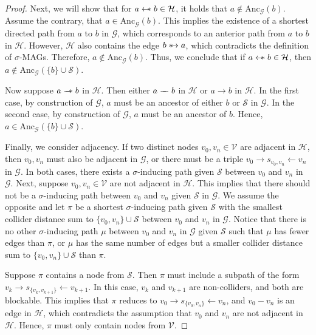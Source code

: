 \documentclass[accepted]{uai2025} %
\newcommand{\anc}{\text{Anc}}
\newcommand{\tuh}{\mathrel{\rightarrow}}
\newcommand{\hus}{\mathrel{{\leftarrow\mkern-11mu\ast}}}
\newcommand{\suh}{\mathrel{{\ast\mkern-11mu\to}}}
\newcommand{\tus}{\mathrel{{\relbar\mkern-11mu\relbar\mkern-11mu\ast}}}
\newcommand{\tut}{\mathrel{{\relbar\mkern-9mu\relbar}}}
\begin{document}
\begin{proof}
Next, we will show that for \( a \hus b \in \mathcal{H} \), it holds that \( a \notin \anc_{\mathcal{G}}(b) \). Assume the contrary, that \( a \in \anc_\mathcal{G}(b) \). This implies the existence of a shortest directed path from \( a \) to \( b \) in \( \mathcal{G} \), which corresponds to an anterior path from \( a \) to \( b \) in \( \mathcal{H} \). However, \( \mathcal{H} \) also contains the edge \( b \suh a \), which contradicts the definition of \( \sigma \)-MAGs. Therefore, \( a \notin \anc_\mathcal{G}(b) \). Thus, we conclude that if \( a \hus b \in \mathcal{H} \), then \( a \notin \anc_\mathcal{G}(\{b\} \cup \mathcal{S}) \).

Now suppose \( a \tus b \) in \( \mathcal{H} \). Then either \( a \tut b \) in \( \mathcal{H} \) or \( a \tuh b \) in \( \mathcal{H} \). In the first case, by construction of \( \mathcal{G} \), \( a \) must be an ancestor of either \( b \) or \( \mathcal{S} \) in \( \mathcal{G} \). In the second case, by construction of \( \mathcal{G} \), \( a \) must be an ancestor of \( b \). Hence, \( a \in \anc_{\mathcal{G}}(\{b\} \cup \mathcal{S}) \).

Finally, we consider adjacency. If two distinct nodes \( v_0, v_n \in \mathcal{V} \) are adjacent in \( \mathcal{H} \), then \( v_0, v_n \) must also be adjacent in \( \mathcal{G} \), or there must be a triple \( v_0 \rightarrow s_{v_0, v_n} \leftarrow v_n \) in \( \mathcal{G} \). In both cases, there exists a \( \sigma \)-inducing path given $\mathcal{S}$ between \( v_0 \) and \( v_n \) in \( \mathcal{G} \). Next, suppose \( v_0, v_n \in \mathcal{V} \) are not adjacent in \( \mathcal{H} \). This implies that there should not be a \( \sigma \)-inducing path between \( v_0 \) and \( v_n \) given \( \mathcal{S} \) in \( \mathcal{G} \). We assume the opposite and let \( \pi \) be a shortest \( \sigma \)-inducing path given $\mathcal{S}$ with the smallest collider distance sum to \( \{v_0, v_n\} \cup \mathcal{S} \) between \( v_0 \) and \( v_n \) in \( \mathcal{G} \). Notice that there is no other \( \sigma \)-inducing path \( \mu \) between \( v_0 \) and \( v_n \) in \( \mathcal{G} \) given $\mathcal{S}$ such that \( \mu \) has fewer edges than \( \pi \), or \( \mu \) has the same number of edges but a smaller collider distance sum to \( \{v_0, v_n\} \cup \mathcal{S} \) than \( \pi \).

Suppose \( \pi \) contains a node from \( \mathcal{S} \). Then \( \pi \) must include a subpath of the form \( v_k \rightarrow s_{\{v_k,v_{k+1}\}} \leftarrow v_{k+1} \). In this case, \( v_k \) and \( v_{k+1} \) are non-colliders, and both are blockable. This implies that \( \pi \) reduces to \( v_0 \rightarrow s_{\{v_0,v_n\}} \leftarrow v_n \), and \( v_0 - v_n \) is an edge in \( \mathcal{H} \), which contradicts the assumption that \( v_0 \) and \( v_n \) are not adjacent in \( \mathcal{H} \). Hence, \( \pi \) must only contain nodes from \( \mathcal{V} \).


\end{proof}
\end{document}
